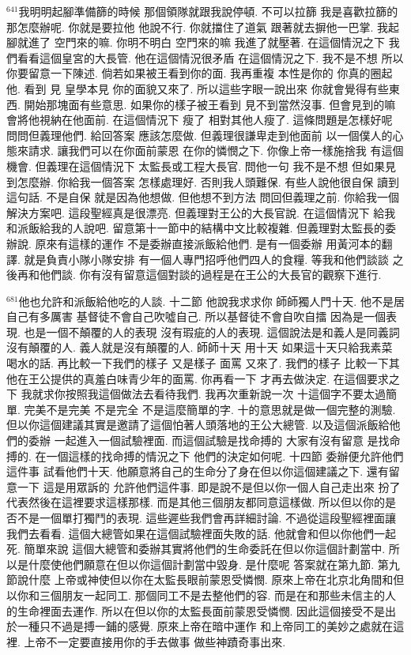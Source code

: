 \documentclass{book}
\begin{document}
$^{641}$我明明起腳準備篩的時候 那個領隊就跟我說停頓.
不可以拉篩 我是喜歡拉篩的 那怎麼辦呢.
你就是要拉他 他說不行.
你就擋住了道氣 跟著就去摒他一巴掌.
我起腳就進了 空門來的嘛.
你明不明白 空門來的嘛 我進了就壓著.
在這個情況之下 我們看看這個皇宮的大長管.
他在這個情況很矛盾 在這個情況之下.
我不是不想 所以你要留意一下陳述.
倘若如果被王看到你的面.
我再重複 本性是你的 你真的圈起他.
看到 見 皇學本見 你的面貌又來了.
所以這些字眼一說出來 你就會覺得有些東西.
開始那塊面有些意思.
如果你的樣子被王看到 見不到當然沒事.
但會見到的嘛 會將他視納在他面前.
在這個情況下 瘦了 相對其他人瘦了.
這條問題是怎樣好呢 問問但義理他們.
給回答案 應該怎麼做.
但義理很謙卑走到他面前 以一個僕人的心態來請求.
讓我們可以在你面前蒙恩 在你的憐憫之下.
你像上帝一樣施捨我 有這個機會.
但義理在這個情況下 太監長或工程大長官.
問他一句 我不是不想 但如果見到怎麼辦.
你給我一個答案 怎樣處理好.
否則我人頭難保.
有些人說他很自保 讀到這句話.
不是自保 就是因為他想做.
但他想不到方法 問回但義理之前.
你給我一個解決方案吧.
這段聖經真是很漂亮.
但義理對王公的大長官說.
在這個情況下 給我和派飯給我的人說吧.
留意第十一節中的結構中文比較複雜.
但義理對太監長的委辦說.
原來有這樣的運作 不是委辦直接派飯給他們.
是有一個委辦 用黃河本的翻譯.
就是負責小隊小隊安排 有一個人專門招呼他們四人的食糧.
等我和他們談談 之後再和他們談.
你有沒有留意這個對談的過程是在王公的大長官的觀察下進行.

$^{681}$他也允許和派飯給他吃的人談.
十二節 他說我求求你 師師獨人門十天.
他不是居自己有多厲害 基督徒不會自己吹噓自己.
所以基督徒不會自吹自擂 因為是一個表現.
也是一個不顛覆的人的表現 沒有瑕疵的人的表現.
這個說法是和義人是同義詞 沒有顛覆的人.
義人就是沒有顛覆的人.
師師十天 用十天 如果這十天只給我素菜 喝水的話.
再比較一下我們的樣子 又是樣子 面罵 又來了.
我們的樣子 比較一下其他在王公提供的真羞白味青少年的面罵.
你再看一下 才再去做決定.
在這個要求之下 我就求你按照我這個做法去看待我們.
我再次重新說一次 十這個字不要太過簡單.
完美不是完美 不是完全 不是這麼簡單的字.
十的意思就是做一個完整的測驗.
但以你這個建議其實是邀請了這個怕著人頭落地的王公大總管.
以及這個派飯給他們的委辦 一起進入一個試驗裡面.
而這個試驗是找命搏的 大家有沒有留意 是找命搏的.
在一個這樣的找命搏的情況之下 他們的決定如何呢.
十四節 委辦便允許他們這件事 試看他們十天.
他願意將自己的生命分了身在但以你這個建議之下.
還有留意一下 這是用眾訴的 允許他們這件事.
即是說不是但以你一個人自己走出來 扮了代表然後在這裡要求這樣那樣.
而是其他三個朋友都同意這樣做.
所以但以你的是否不是一個單打獨鬥的表現.
這些遲些我們會再詳細討論.
不過從這段聖經裡面讓我們去看看.
這個大總管如果在這個試驗裡面失敗的話.
他就會和但以你他們一起死.
簡單來說 這個大總管和委辦其實將他們的生命委託在但以你這個計劃當中.
所以是什麼使他們願意在但以你這個計劃當中毀身.
是什麼呢 答案就在第九節.
第九節說什麼 上帝或神使但以你在太監長眼前蒙恩受憐憫.
原來上帝在北京北角間和但以你和三個朋友一起同工.
那個同工不是去整他們的容.
而是在和那些未信主的人的生命裡面去運作.
所以在但以你的太監長面前蒙恩受憐憫.
因此這個接受不是出於一種只不過是搏一鋪的感覺.
原來上帝在暗中運作 和上帝同工的美妙之處就在這裡.
上帝不一定要直接用你的手去做事 做些神蹟奇事出來.
\end{document}
